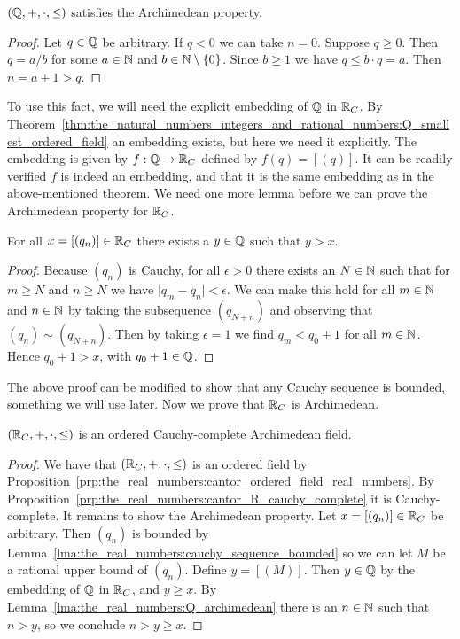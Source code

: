 \documentclass[../main.tex]{subfiles}
\begin{document}
\begin{lemma}\label{lma:the_real_numbers:Q_archimedean}
    $(\mathbb{Q},+,\cdot,\leq)$ satisfies the Archimedean property.
\end{lemma}
\begin{proof}
    Let $q\in\mathbb{Q}$ be arbitrary. If $q<0$ we can take $n=0$. Suppose $q\geq0$. Then $q=a/b$ for some $a\in\mathbb{N}$ and $b\in\mathbb{N}\setminus\{0\}$. Since $b\geq1$ we have $q\leq b\cdot q=a$. Then $n=a+1>q$.
\end{proof}
To use this fact, we will need the explicit embedding of $\mathbb{Q}$ in $\mathbb{R}_C$. By Theorem~\ref{thm:the_natural_numbers_integers_and_rational_numbers:Q_smallest_ordered_field} an embedding exists, but here we need it explicitly. The embedding is given by $f:\mathbb{Q}\to\mathbb{R}_C$ defined by $f(q)=[(q)]$. It can be readily verified $f$ is indeed an embedding, and that it is the same embedding as in the above-mentioned theorem. We need one more lemma before we can prove the Archimedean property for $\mathbb{R}_C$.
\begin{lemma}\label{lma:the_real_numbers:cauchy_sequence_bounded}
    For all $x=[(q_n)]\in\mathbb{R}_C$ there exists a $y\in\mathbb{Q}$ such that $y>x$.
\end{lemma}
\begin{proof}
    Because $(q_n)$ is Cauchy, for all $\epsilon>0$ there exists an $N\in\mathbb{N}$ such that for $m\geq N$ and $n\geq N$ we have $\vert q_m-q_n\vert<\epsilon$. We can make this hold for all $m\in\mathbb{N}$ and $n\in\mathbb{N}$ by taking the subsequence $(q_{N+n})$ and observing that $(q_n)\sim(q_{N+n})$. Then by taking $\epsilon=1$ we find $q_m<q_0+1$ for all $m\in\mathbb{N}$. Hence $q_0+1>x$, with $q_0+1\in\mathbb{Q}$.
\end{proof}
The above proof can be modified to show that any Cauchy sequence is bounded, something we will use later. Now we prove that $\mathbb{R}_C$ is Archimedean.
\begin{proposition}\label{prp:the_real_numbers:cantor_R_cauchy_complete_archimedean}
    $(\mathbb{R}_C,+,\cdot,\leq)$ is an ordered Cauchy-complete Archimedean field.
\end{proposition}
\begin{proof}
    We have that $(\mathbb{R}_C,+,\cdot,\leq)$ is an ordered field by Proposition~\ref{prp:the_real_numbers:cantor_ordered_field_real_numbers}. By Proposition~\ref{prp:the_real_numbers:cantor_R_cauchy_complete} it is Cauchy-complete. It remains to show the Archimedean property. Let $x=[(q_n)]\in\mathbb{R}_C$ be arbitrary. Then $(q_n)$ is bounded by Lem\-ma~\ref{lma:the_real_numbers:cauchy_sequence_bounded} so we can let $M$ be a rational upper bound of $(q_n)$. Define $y=[(M)]$. Then $y\in\mathbb{Q}$ by the embedding of $\mathbb{Q}$ in $\mathbb{R}_C$, and $y\geq x$. By Lemma~\ref{lma:the_real_numbers:Q_archimedean} there is an $n\in\mathbb{N}$ such that $n>y$, so we conclude $n>y\geq x$.
\end{proof}
\end{document}
